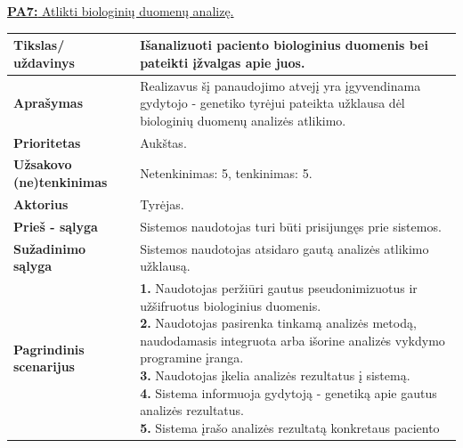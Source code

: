 \documentclass[12pt]{article}
\begin{document}
\newpage

\noindent \hypertarget{FR7}{\hyperlink{PA7}{\textbf{PA7:} Atlikti biologinių
duomenų analizę.}}
\label{sec:FR7}
\begin{table}[htb!]
    \captionsetup{justification=centering}
    \begin{tabular}{|m{3cm}|m{13.7cm}|}
        \hline
        \raggedleft \textbf{\cellcolor{deepchampagne}Tikslas/ uždavinys} &
        Išanalizuoti paciento biologinius duomenis bei pateikti įžvalgas apie
        juos. \\
        \hline
        \raggedleft \textbf{\cellcolor{deepchampagne}Aprašymas} &
        Realizavus šį panaudojimo atvejį yra įgyvendinama gydytojo - genetiko
        tyrėjui pateikta užklausa dėl biologinių duomenų analizės atlikimo. \\
        \hline
        \raggedleft \textbf{\cellcolor{deepchampagne}Prioritetas} & Aukštas. \\
        \hline
        \raggedleft \textbf{\cellcolor{deepchampagne}Užsakovo (ne)tenkinimas} &
        Netenkinimas: 5, tenkinimas: 5. \\
        \hline
        \raggedleft \textbf{\cellcolor{deepchampagne}Aktorius} &
        Tyrėjas. \\
        \hline
        \raggedleft \textbf{\cellcolor{deepchampagne}Prieš - sąlyga} &
        Sistemos naudotojas turi būti prisijungęs prie sistemos. \\
        \hline
        \raggedleft \textbf{\cellcolor{deepchampagne}Sužadinimo sąlyga} &
        Sistemos naudotojas atsidaro gautą analizės atlikimo užklausą. \\
        \hline
        \raggedleft \textbf{\cellcolor{deepchampagne}Pagrindinis
        scenarijus} & \vskip 5pt
        \makecell[l]{\parbox[t]{13.7cm}{
            \textbf{1.} \textcolor{dartmouthgreen}{Naudotojas peržiūri gautus
            pseudonimizuotus ir užšifruotus biologinius duomenis.} \\
            \textbf{2.} \textcolor{dartmouthgreen}{Naudotojas pasirenka tinkamą
            analizės metodą, naudodamasis integruota arba išorine analizės
            vykdymo programine įranga.} \\
            \textbf{3.} \textcolor{dartmouthgreen}{Naudotojas įkelia analizės
            rezultatus į sistemą.} \\
            \textbf{4.} Sistema informuoja gydytoją - genetiką apie gautus
            analizės rezultatus. \\
            \textbf{5.} Sistema įrašo analizės rezultatą konkretaus paciento
}}
\end{tabular}
\end{table}
\end{document}
